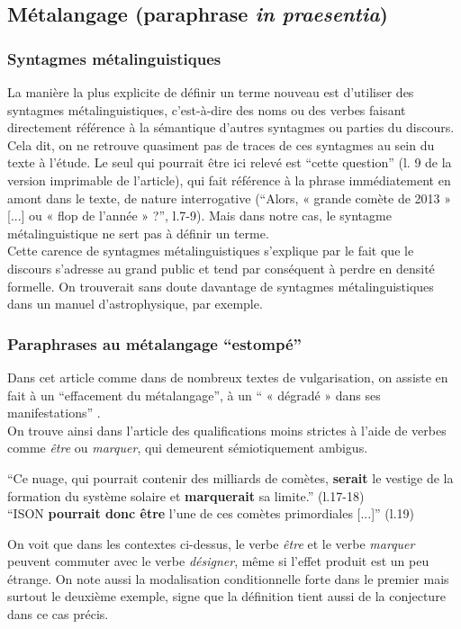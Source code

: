 \documentclass[a4paper,10pt]{article}
\begin{document}
	\subsection{Métalangage (paraphrase \textit{in praesentia})} \label{inpraesentia}
		\subsubsection{Syntagmes métalinguistiques}
			La manière la plus explicite de définir un terme nouveau est d'utiliser des syntagmes métalinguistiques, c'est-à-dire des noms ou des verbes faisant directement référence à la sémantique d'autres syntagmes ou parties du discours. Cela dit, on ne retrouve quasiment pas de traces de ces syntagmes au sein du texte à l'étude. Le seul qui pourrait être ici relevé est ``cette question'' (l. 9 de la version imprimable de l'article), qui fait référence à la phrase immédiatement en amont dans le texte, de nature interrogative (``Alors, « grande comète de 2013 » [...] ou « flop de l'année » ?'', l.7-9). Mais dans notre cas, le syntagme métalinguistique ne sert pas à définir un terme.\\
			Cette carence de syntagmes métalinguistiques s'explique par le fait que le discours s'adresse au grand public et tend par conséquent à perdre en densité formelle. On trouverait sans doute davantage de syntagmes métalinguistiques dans un manuel d'astrophysique, par exemple.
		\subsubsection{Paraphrases au métalangage ``estompé''} \label{estompe}
			Dans cet article comme dans de nombreux textes de vulgarisation, on assiste en fait à un ``effacement du métalangage'', à un `` « dégradé » dans ses manifestations'' \cite{Mortureux1982}.\\
			On trouve ainsi dans l'article des qualifications moins strictes à l'aide de verbes comme \textit{être} ou \textit{marquer}, qui demeurent sémiotiquement ambigus.
			\begin{center}
				\footnotesize
				\begin{minipage}{0.7\textwidth}
					``Ce nuage, qui pourrait contenir des milliards de comètes, \textbf{serait} le vestige de la formation du système solaire et \textbf{marquerait} sa limite.'' (l.17-18)\\
					``ISON \textbf{pourrait donc être} l'une de ces comètes primordiales [...]'' (l.19)
				\end{minipage}
			\end{center}
			On voit que dans les contextes ci-dessus, le verbe \textit{être} et le verbe \textit{marquer} peuvent commuter avec le verbe \textit{désigner}, même si l'effet produit est un peu étrange. On note aussi la modalisation conditionnelle forte dans le premier mais surtout le deuxième exemple, signe que la définition tient aussi de la conjecture dans ce cas précis.\\
			
\end{document}
